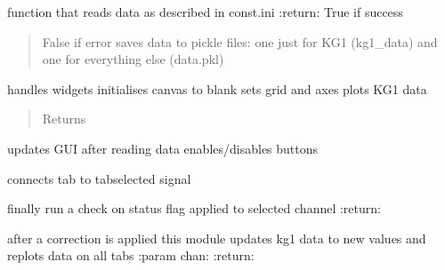 \documentclass[letterpaper,10pt,english]{sphinxmanual}
\begin{document}
\begin{fulllineitems}

\begin{fulllineitems}
\label{Cormat_main:Cormat_main.CORMAT_GUI.readdata}
function that reads data as described in const.ini
:return: True if success
\begin{quote}

False if error
saves data to pickle files: one just for KG1 (kg1\_data) and one for everything else (data.pkl)
\end{quote}

\end{fulllineitems}


\begin{fulllineitems}
\label{Cormat_main:Cormat_main.CORMAT_GUI.plot_data}
handles widgets
initialises canvas to blank
sets grid and axes
plots KG1 data
\begin{quote}\begin{description}
\item[{Returns}] \leavevmode


\end{description}\end{quote}

\end{fulllineitems}


\begin{fulllineitems}
\label{Cormat_main:Cormat_main.CORMAT_GUI.GUI_refresh}
updates GUI after reading data
enables/disables buttons

connects tab to tabselected signal

finally run a check on status flag applied to selected channel
:return:

\end{fulllineitems}


\begin{fulllineitems}
\label{Cormat_main:Cormat_main.CORMAT_GUI.update_channel}
after a correction is applied this module updates kg1 data to new values
and replots data on all tabs
:param chan:
:return:


\end{fulllineitems}
\end{fulllineitems}
\end{document}

